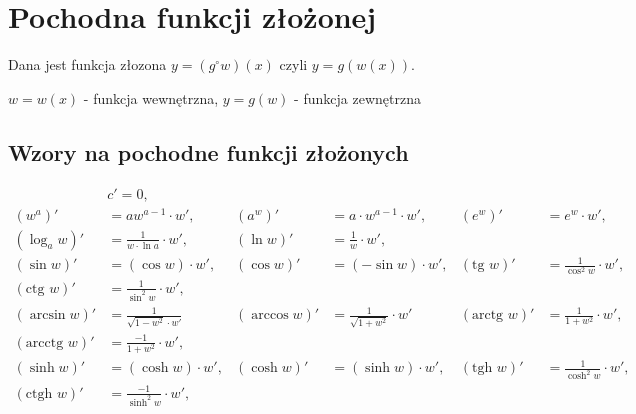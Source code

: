 \documentclass[11pt]{article}
\begin{document}
\section{Pochodna funkcji złożonej}
\label{sec:org65a5e34}
Dana jest funkcja złozona \(y = (g^\circ w)(x)\) czyli \(y = g(w(x))\).
\begin{center}
\(w = w(x)\) - funkcja wewnętrzna, \qquad \(y = g(w)\) - funkcja zewnętrzna
\end{center}
\subsection{Wzory na pochodne funkcji złożonych}
\label{sec:org0bf37d2}
\begin{align*}
  & c' = 0,
  \\ \left(w^{a}\right)'&= a w^{a-1} \cdot w',
                        & \left(a^{w} \right)' &= a  \cdot w^{a-1} \cdot w',
                                               & \left( e^{w} \right)' &= e^{w} \cdot w',
  \\ \left(\log_{a}w \right)' &= \frac{1}{w \cdot \ln a} \cdot w',
                        & \left( \ln w \right)' &= \frac{1}{w} \cdot w',
  \\ \left( \sin w \right)' &= (\cos w) \cdot w',
                        & \left( \cos w \right)' &= (- \sin w) \cdot w',
                                               & \left( \text{tg } w \right)' &= \frac{1}{\cos^{2} w} \cdot w' ,
  \\ \left(\text{ctg } w \right)' &= \frac{1}{\sin^{2} w} \cdot w',
  \\  \left( \arcsin w \right)' &= \frac{1}{\sqrt{1-w^{2}} \cdot w'}
                        & \left(\arccos w \right)' &=\frac{1}{\sqrt{1+w^{2}}} \cdot w'
                                               & \left( \text{arctg } w \right)' &= \frac{1}{1+w^{2}} \cdot w',
  \\ \left( \text{arcctg } w \right)' &= \frac{-1}{1+w^{2}} \cdot w',
  \\  \left( \sinh w \right )' &=  (\cosh w) \cdot w' ,
                        & \left( \cosh w \right )' &= (\sinh w) \cdot w',
                                               & \left( \text{tgh } w \right )' &= \frac{1}{\cosh^{2} w} \cdot w',
  \\ \left( \text{ctgh } w \right )' &= \frac{-1}{\sinh ^{2} w} \cdot w',
\end{align*}
\end{document}
